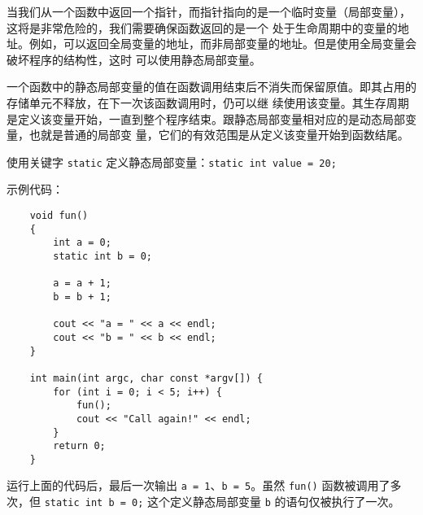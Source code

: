 \documentclass[UTF8]{ctexart}
\begin{document}
当我们从一个函数中返回一个指针，而指针指向的是一个临时变量（局部变量），这将是非常危险的，我们需要确保函数返回的是一个
处于生命周期中的变量的地址。例如，可以返回全局变量的地址，而非局部变量的地址。但是使用全局变量会破坏程序的结构性，这时
可以使用静态局部变量。

一个函数中的静态局部变量的值在函数调用结束后不消失而保留原值。即其占用的存储单元不释放，在下一次该函数调用时，仍可以继
续使用该变量。其生存周期是定义该变量开始，一直到整个程序结束。跟静态局部变量相对应的是动态局部变量，也就是普通的局部变
量，它们的有效范围是从定义该变量开始到函数结尾。

使用关键字 \texttt{static} 定义静态局部变量：\texttt{static int value = 20;}

示例代码：
\begin{verbatim}
    void fun()
    {
        int a = 0;
        static int b = 0;

        a = a + 1;
        b = b + 1;

        cout << "a = " << a << endl;
        cout << "b = " << b << endl;
    }

    int main(int argc, char const *argv[]) {
        for (int i = 0; i < 5; i++) {
            fun();
            cout << "Call again!" << endl;
        }
        return 0;
    }
\end{verbatim}

运行上面的代码后，最后一次输出 \texttt{a = 1}、\texttt{b = 5}。虽然 \texttt{fun()} 函数被调用了多次，但
\texttt{static int b = 0;} 这个定义静态局部变量 \texttt{b} 的语句仅被执行了一次。
\end{document}
